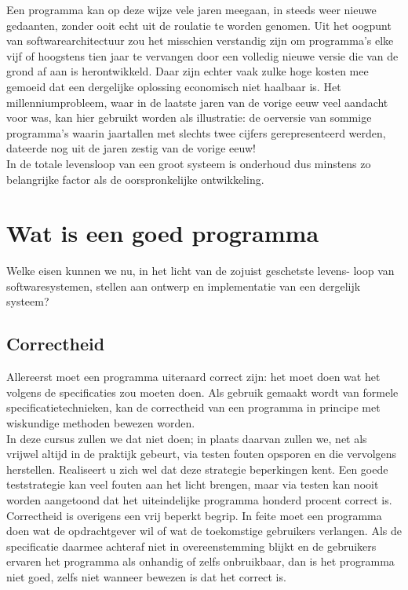 \documentclass{article}
\begin{document}
	Een programma kan op deze wijze vele jaren meegaan, in steeds weer
	nieuwe gedaanten, zonder ooit echt uit de roulatie te worden genomen.
	Uit het oogpunt van softwarearchitectuur zou het misschien verstandig
	zijn om programma’s elke vijf of hoogstens tien jaar te vervangen door
	een volledig nieuwe versie die van de grond af aan is herontwikkeld.
	Daar zijn echter vaak zulke hoge kosten mee gemoeid dat een dergelijke
	oplossing economisch niet haalbaar is. Het millenniumprobleem, waar
	in de laatste jaren van de vorige eeuw veel aandacht voor was, kan hier
	gebruikt worden als illustratie: de oerversie van sommige programma’s
	waarin jaartallen met slechts twee cijfers gerepresenteerd werden,
	dateerde nog uit de jaren zestig van de vorige eeuw! \\
	In de totale levensloop van een groot systeem is onderhoud dus
	minstens zo belangrijke factor als de oorspronkelijke ontwikkeling. \\
	
	\section{Wat is een goed programma}
	
	Welke eisen kunnen we nu, in het licht van de zojuist geschetste levens-
	loop van softwaresystemen, stellen aan ontwerp en implementatie van
	een dergelijk systeem?
	
	\subsection{Correctheid}
	
	Allereerst moet een programma uiteraard correct zijn: het moet doen
	wat het volgens de specificaties zou moeten doen. Als gebruik gemaakt
	wordt van formele specificatietechnieken, kan de correctheid van een
	programma in principe met wiskundige methoden bewezen worden. \\
	In deze cursus zullen we dat niet doen; in plaats daarvan zullen we, net
	als vrijwel altijd in de praktijk gebeurt, via testen fouten opsporen en die
	vervolgens herstellen. Realiseert u zich wel dat deze strategie beperkingen
	kent. Een goede teststrategie kan veel fouten aan het licht brengen, maar
	via testen kan nooit worden aangetoond dat het uiteindelijke programma
	honderd procent correct is. \\
	Correctheid is overigens een vrij beperkt begrip. In feite moet een
	programma doen wat de opdrachtgever wil of wat de toekomstige
	gebruikers verlangen. Als de specificatie daarmee achteraf niet in
	overeenstemming blijkt en de gebruikers ervaren het programma als
	onhandig of zelfs onbruikbaar, dan is het programma niet goed, zelfs
	niet wanneer bewezen is dat het correct is. \\
	
\end{document}
